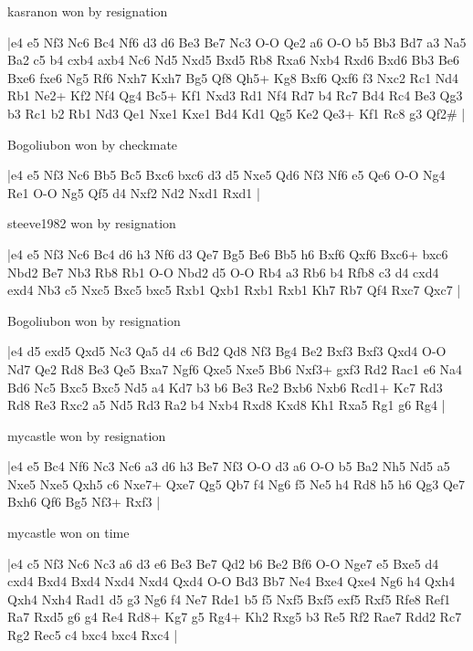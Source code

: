 \showboard

kasranon won by resignation

\makegametitle
|e4 e5 Nf3 Nc6 Bc4 Nf6 d3 d6 Be3 Be7 Nc3 O-O Qe2 a6 O-O b5 Bb3 Bd7 a3 Na5 Ba2 c5 b4 cxb4 axb4 Nc6 Nd5 Nxd5 Bxd5 Rb8 Rxa6 Nxb4 Rxd6 Bxd6 Bb3 Be6 Bxe6 fxe6 Ng5 Rf6 Nxh7 Kxh7 Bg5 Qf8 Qh5+ Kg8 Bxf6 Qxf6 f3 Nxc2 Rc1 Nd4 Rb1 Ne2+ Kf2 Nf4 Qg4 Bc5+ Kf1 Nxd3 Rd1 Nf4 Rd7 b4 Rc7 Bd4 Rc4 Be3 Qg3 b3 Rc1 b2 Rb1 Nd3 Qe1 Nxe1 Kxe1 Bd4 Kd1 Qg5 Ke2 Qe3+ Kf1 Rc8 g3 Qf2\#  |

\showboard

Bogoliubon won by checkmate

\makegametitle
|e4 e5 Nf3 Nc6 Bb5 Bc5 Bxc6 bxc6 d3 d5 Nxe5 Qd6 Nf3 Nf6 e5 Qe6 O-O Ng4 Re1 O-O Ng5 Qf5 d4 Nxf2 Nd2 Nxd1 Rxd1  |

\showboard

steeve1982 won by resignation

\makegametitle
|e4 e5 Nf3 Nc6 Bc4 d6 h3 Nf6 d3 Qe7 Bg5 Be6 Bb5 h6 Bxf6 Qxf6 Bxc6+ bxc6 Nbd2 Be7 Nb3 Rb8 Rb1 O-O Nbd2 d5 O-O Rb4 a3 Rb6 b4 Rfb8 c3 d4 cxd4 exd4 Nb3 c5 Nxc5 Bxc5 bxc5 Rxb1 Qxb1 Rxb1 Rxb1 Kh7 Rb7 Qf4 Rxc7 Qxc7  |

\showboard

Bogoliubon won by resignation

\makegametitle
|e4 d5 exd5 Qxd5 Nc3 Qa5 d4 c6 Bd2 Qd8 Nf3 Bg4 Be2 Bxf3 Bxf3 Qxd4 O-O Nd7 Qe2 Rd8 Be3 Qe5 Bxa7 Ngf6 Qxe5 Nxe5 Bb6 Nxf3+ gxf3 Rd2 Rac1 e6 Na4 Bd6 Nc5 Bxc5 Bxc5 Nd5 a4 Kd7 b3 b6 Be3 Re2 Bxb6 Nxb6 Rcd1+ Kc7 Rd3 Rd8 Re3 Rxc2 a5 Nd5 Rd3 Ra2 b4 Nxb4 Rxd8 Kxd8 Kh1 Rxa5 Rg1 g6 Rg4  |

\showboard

mycastle won by resignation

\makegametitle
|e4 e5 Bc4 Nf6 Nc3 Nc6 a3 d6 h3 Be7 Nf3 O-O d3 a6 O-O b5 Ba2 Nh5 Nd5 a5 Nxe5 Nxe5 Qxh5 c6 Nxe7+ Qxe7 Qg5 Qb7 f4 Ng6 f5 Ne5 h4 Rd8 h5 h6 Qg3 Qe7 Bxh6 Qf6 Bg5 Nf3+ Rxf3  |

\showboard

mycastle won on time

\makegametitle
|e4 c5 Nf3 Nc6 Nc3 a6 d3 e6 Be3 Be7 Qd2 b6 Be2 Bf6 O-O Nge7 e5 Bxe5 d4 cxd4 Bxd4 Bxd4 Nxd4 Nxd4 Qxd4 O-O Bd3 Bb7 Ne4 Bxe4 Qxe4 Ng6 h4 Qxh4 Qxh4 Nxh4 Rad1 d5 g3 Ng6 f4 Ne7 Rde1 b5 f5 Nxf5 Bxf5 exf5 Rxf5 Rfe8 Ref1 Ra7 Rxd5 g6 g4 Re4 Rd8+ Kg7 g5 Rg4+ Kh2 Rxg5 b3 Re5 Rf2 Rae7 Rdd2 Rc7 Rg2 Rec5 c4 bxc4 bxc4 Rxc4  |

